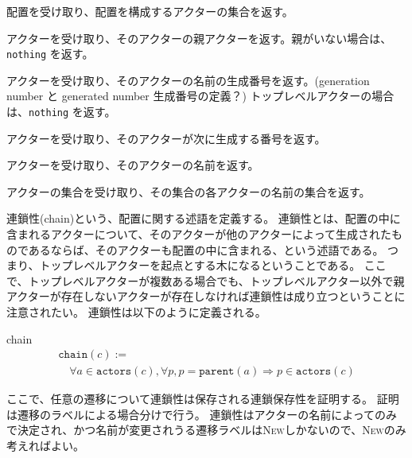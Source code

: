 \begin{description}[style=nextline,leftmargin=12pt,parsep=0pt]
\item[\texttt{actors} $: \textit{Configuration} \rightarrow \textit{Set(Actor)}$]
  配置を受け取り、配置を構成するアクターの集合を返す。
\item[\texttt{parent} $: \textit{Actor} \rightarrow \textit{Actor}$]
  アクターを受け取り、そのアクターの親アクターを返す。親がいない場合は、\texttt{nothing} を返す。
\item[\texttt{gen\_number} $: \textit{Actor} \rightarrow \mathbb{N}$]
  アクターを受け取り、そのアクターの名前の生成番号を返す。(generation number と generated number 生成番号の定義？)
  トップレベルアクターの場合は、\texttt{nothing} を返す。
\item[\texttt{next\_number} $: \textit{Actor} \rightarrow \mathbb{N}$]
  アクターを受け取り、そのアクターが次に生成する番号を返す。
\item[\texttt{name} $: \textit{Actor} \rightarrow \textit{Name}$]
  アクターを受け取り、そのアクターの名前を返す。
\item[\texttt{names} $: \textit{Set(Actor)} \rightarrow \textit{Set(Name)}$]
  アクターの集合を受け取り、その集合の各アクターの名前の集合を返す。
\end{description}

連鎖性(chain)という、配置に関する述語を定義する。
連鎖性とは、配置の中に含まれるアクターについて、そのアクターが他のアクターによって生成されたものであるならば、そのアクターも配置の中に含まれる、という述語である。
つまり、トップレベルアクターを起点とする木になるということである。
ここで、トップレベルアクターが複数ある場合でも、トップレベルアクター以外で親アクターが存在しないアクターが存在しなければ連鎖性は成り立つということに注意されたい。
連鎖性は以下のように定義される。

\begin{definition}{chain}
\begin{displaymath}
  \begin{array}{l}
    \texttt{chain}(c) := \\
    \quad \forall a \in \texttt{actors}(c), \forall p, p = \texttt{parent}(a) \Rightarrow p \in \texttt{actors}(c)
  \end{array}
\end{displaymath}
\end{definition}

ここで、任意の遷移について連鎖性は保存される連鎖保存性を証明する。
証明は遷移のラベルによる場合分けで行う。
連鎖性はアクターの名前によってのみで決定され、かつ名前が変更されうる遷移ラベルは\textsc{New}しかないので、\textsc{New}のみ考えればよい。

